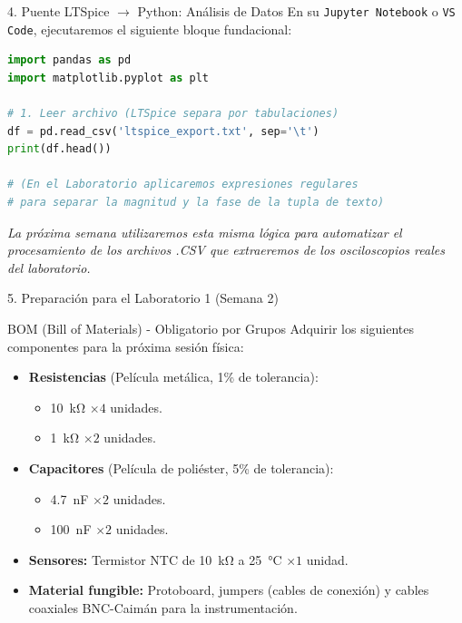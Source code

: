 \documentclass[aspectratio=169, 10pt]{beamer}
\begin{document}
\begin{frame}[fragile]{4. Puente LTSpice $\rightarrow$ Python: Análisis de Datos}
    En su \texttt{Jupyter Notebook} o \texttt{VS Code}, ejecutaremos el siguiente bloque fundacional:
    \begin{lstlisting}[language=Python]
import pandas as pd
import matplotlib.pyplot as plt

# 1. Leer archivo (LTSpice separa por tabulaciones)
df = pd.read_csv('ltspice_export.txt', sep='\t')
print(df.head())

# (En el Laboratorio aplicaremos expresiones regulares 
# para separar la magnitud y la fase de la tupla de texto)
    \end{lstlisting}
    \textit{La próxima semana utilizaremos esta misma lógica para automatizar el procesamiento de los archivos .CSV que extraeremos de los osciloscopios reales del laboratorio.}
\end{frame}

\begin{frame}{5. Preparación para el Laboratorio 1 (Semana 2)}
    \begin{block}{BOM (Bill of Materials) - Obligatorio por Grupos}
        Adquirir los siguientes componentes para la próxima sesión física:
        \begin{itemize}
            \item \textbf{Resistencias} (Película metálica, 1\% de tolerancia):
                \begin{itemize}
                    \item \SI{10}{\kilo\ohm} $\times 4$ unidades.
                    \item \SI{1}{\kilo\ohm} $\times 2$ unidades.
                \end{itemize}
            \item \textbf{Capacitores} (Película de poliéster, 5\% de tolerancia):
                \begin{itemize}
                    \item \SI{4.7}{\nano\farad} $\times 2$ unidades.
                    \item \SI{100}{\nano\farad} $\times 2$ unidades.
                \end{itemize}
            \item \textbf{Sensores:} Termistor NTC de \SI{10}{\kilo\ohm} a \SI{25}{\celsius} $\times 1$ unidad.
            \item \textbf{Material fungible:} Protoboard, jumpers (cables de conexión) y cables coaxiales BNC-Caimán para la instrumentación.
        \end{itemize}
    \end{block}
\end{frame}
\end{document}
